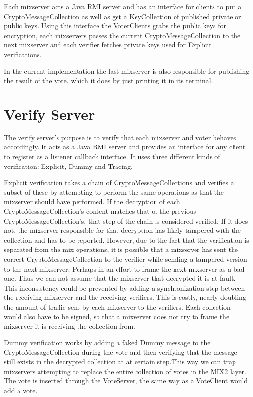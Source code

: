 \documentclass[a4paper,11pt]{kth-mag}
\begin{document}
Each mixserver acts a Java RMI server and has an interface for clients to put a CryptoMessageCollection as well as get a KeyCollection of published private or public keys. Using this interface the VoterClients grabs the public keys for encryption, each mixservers passes the current CryptoMessageCollection to the next mixserver and each verifier fetches private keys used for Explicit verifications.

In the current implementation the last mixserver is also responsible for publishing the result of the vote, which it does by just printing it in its terminal. 

\section{Verify Server}

The verify server’s purpose is to verify that each mixserver and voter behaves accordingly. It acts as a Java RMI server and provides an interface for any client to register as a listener callback interface. It uses three different kinds of verification: Explicit, Dummy and Tracing.

Explicit verification takes a chain of CryptoMessageCollections and verifies a subset of these by attempting to perform the same operations as that the mixserver should have performed. If the decryption of each CryptoMessageCollection’s content matches that of the previous CryptoMessageCollection’s, that step of the chain is considered verified. If it does not, the mixserver responsible for that decryption has likely tampered with the collection and has to be reported. However, due to the fact that the verification is separated from the mix operations, it is possible that a mixserver has sent the correct CryptoMessageCollection to the verifier while sending a tampered version to the next mixserver. Perhaps in an effort to frame the next mixserver as a bad one. Thus we can not assume that the mixserver that decrypted it is at fault. This inconsistency could be prevented by adding a synchronization step between the receiving mixserver and the receiving verifiers. This is costly, nearly doubling the amount of traffic sent by each mixserver to the verifiers. Each collection would also have to be signed, so that a mixserver does not try to frame the mixserver it is receiving the collection from.

Dummy verification works by adding a faked Dummy message to the CryptoMessageCollection during the vote and then verifying that the message still exists in the decrypted collection at at certain step.This way we can trap mixservers attempting to replace the entire collection of votes in the MIX2 layer. The vote is inserted through the VoteServer, the same way as a VoteClient would add a vote.
\end{document}
